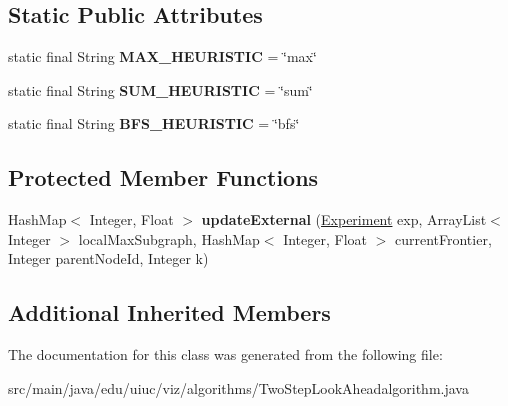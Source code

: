 \subsection*{Static Public Attributes}
\begin{DoxyCompactItemize}
\item 
\mbox{\label{classedu_1_1uiuc_1_1viz_1_1algorithms_1_1_two_step_look_aheadalgorithm_a56d4305e7bcda20acae5122540ae4bbb}} 
static final String {\bfseries M\+A\+X\+\_\+\+H\+E\+U\+R\+I\+S\+T\+IC} = \char`\"{}max\char`\"{}
\item 
\mbox{\label{classedu_1_1uiuc_1_1viz_1_1algorithms_1_1_two_step_look_aheadalgorithm_aa53b7c67441e6c1d42c152caeaa282aa}} 
static final String {\bfseries S\+U\+M\+\_\+\+H\+E\+U\+R\+I\+S\+T\+IC} = \char`\"{}sum\char`\"{}
\item 
\mbox{\label{classedu_1_1uiuc_1_1viz_1_1algorithms_1_1_two_step_look_aheadalgorithm_a9b864c47059ed42a77de903233bbf6c0}} 
static final String {\bfseries B\+F\+S\+\_\+\+H\+E\+U\+R\+I\+S\+T\+IC} = \char`\"{}bfs\char`\"{}
\end{DoxyCompactItemize}
\subsection*{Protected Member Functions}
\begin{DoxyCompactItemize}
\item 
\mbox{\label{classedu_1_1uiuc_1_1viz_1_1algorithms_1_1_two_step_look_aheadalgorithm_a0193b2b08d366154293f1c17249f1d8c}} 
Hash\+Map$<$ Integer, Float $>$ {\bfseries update\+External} (\mbox{\hyperlink{classedu_1_1uiuc_1_1viz_1_1algorithms_1_1_experiment}{Experiment}} exp, Array\+List$<$ Integer $>$ local\+Max\+Subgraph, Hash\+Map$<$ Integer, Float $>$ current\+Frontier, Integer parent\+Node\+Id, Integer k)
\end{DoxyCompactItemize}
\subsection*{Additional Inherited Members}


The documentation for this class was generated from the following file\+:\begin{DoxyCompactItemize}
\item 
src/main/java/edu/uiuc/viz/algorithms/Two\+Step\+Look\+Aheadalgorithm.\+java\end{DoxyCompactItemize}
